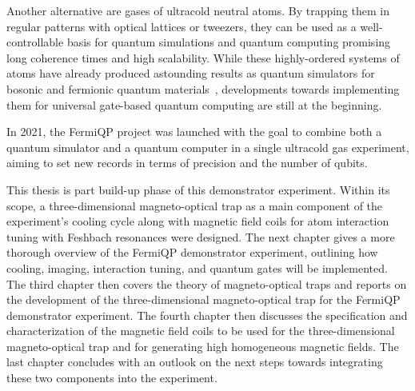 Another alternative are gases of ultracold neutral atoms. By trapping them in regular patterns with optical lattices or tweezers, they can be used as a well-controllable basis for quantum simulations and quantum computing promising long coherence times and high scalability. While these highly-ordered systems of atoms have already produced astounding results as quantum simulators for bosonic and fermionic quantum materials~\cite{bloch_quantum_2012, gross_quantum_2017}, developments towards implementing them for universal gate-based quantum computing are still at the beginning.

In 2021, the FermiQP project was launched with the goal to combine both a quantum simulator and a quantum computer in a single ultracold gas experiment, aiming to set new records in terms of precision and the number of qubits. 

This thesis is part build-up phase of this demonstrator experiment. Within its scope, a three-dimensional magneto-optical trap as a main component of the experiment's cooling cycle along with magnetic field coils for atom interaction tuning with Feshbach resonances were designed. The next chapter gives a more thorough overview of the FermiQP demonstrator experiment, outlining how cooling, imaging, interaction tuning, and quantum gates will be implemented. The third chapter then covers the theory of magneto-optical traps and reports on the development of the three-dimensional magneto-optical trap for the FermiQP demonstrator experiment. The fourth chapter then discusses the specification and characterization of the magnetic field coils to be used for the three-dimensional magneto-optical trap and for generating high homogeneous magnetic fields. The last chapter concludes with an outlook on the next steps towards integrating these two components into the experiment.


